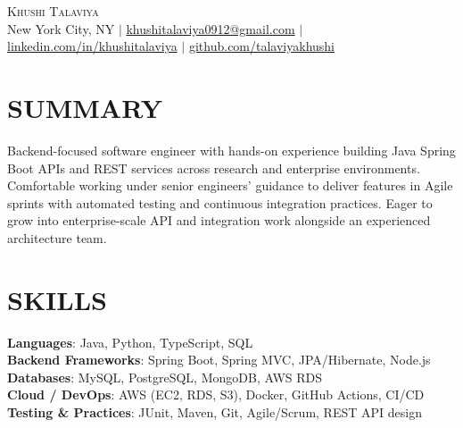 \documentclass[letterpaper,11pt]{article}
\begin{document}
\begin{center}
    {\Huge \scshape Khushi Talaviya} \\ \vspace{2pt}
    \vspace{4pt}
    \small
    New York City, NY $|$
    \href{mailto:khushitalaviya0912@gmail.com}{khushitalaviya0912@gmail.com} $|$
    \href{https://www.linkedin.com/in/khushitalaviya/}{linkedin.com/in/khushitalaviya} $|$
    \href{https://github.com/talaviyakhushi}{github.com/talaviyakhushi}
\end{center}

\section{SUMMARY}
\vspace{5pt}
\small{Backend-focused software engineer with hands-on experience building Java Spring Boot APIs and REST services across research and enterprise environments. Comfortable working under senior engineers' guidance to deliver features in Agile sprints with automated testing and continuous integration practices. Eager to grow into enterprise-scale API and integration work alongside an experienced architecture team.}

\vspace{2pt}
\section{SKILLS}
\vspace{5pt}
\begin{itemize}[leftmargin=0in, label={}]
\small{\item{
\textbf{Languages}{: Java, Python, TypeScript, SQL} \\
\textbf{Backend Frameworks}{: Spring Boot, Spring MVC, JPA/Hibernate, Node.js} \\
\textbf{Databases}{: MySQL, PostgreSQL, MongoDB, AWS RDS} \\
\textbf{Cloud / DevOps}{: AWS (EC2, RDS, S3), Docker, GitHub Actions, CI/CD} \\
\textbf{Testing \& Practices}{: JUnit, Maven, Git, Agile/Scrum, REST API design}
}}
\end{itemize}
\vspace{-10pt}

\end{document}
